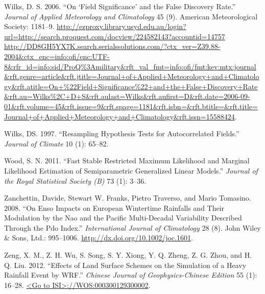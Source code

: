 \documentclass[fleqn,10pt,lineno]{wlpeerj} %
\begin{document}
\hypertarget{ref-Wilks2006}{}
Wilks, D. S. 2006. ``On `Field Significance' and the False Discovery
Rate.'' \emph{Journal of Applied Meteorology and Climatology} 45 (9).
American Meteorological Society: 1181--9.
\href{http://ezproxy.library.usyd.edu.au/login?url=http://search.proquest.com/docview/224582143?accountid=14757\%20http://DD8GH5YX7K.search.serialssolutions.com/?ctx_ver=Z39.88-2004\&ctx_enc=info:ofi/enc:UTF-8\&rfr_id=info:sid/ProQ\%3Amilitary\&rft_val_fmt=info:ofi/fmt:kev:mtx:journal\&rft.genre=article\&rft.jtitle=Journal+of+Applied+Meteorology+and+Climatology\&rft.atitle=On+\%22Field+Significance\%22+and+the+False+Discovery+Rate\&rft.au=Wilks\%2C+D+S\&rft.aulast=Wilks\&rft.aufirst=D\&rft.date=2006-09-01\&rft.volume=45\&rft.issue=9\&rft.spage=1181\&rft.isbn=\&rft.btitle=\&rft.title=Journal+of+Applied+Meteorology+and+Climatology\&rft.issn=15588424}{http://ezproxy.library.usyd.edu.au/login?url=http://search.proquest.com/docview/224582143?accountid=14757 http://DD8GH5YX7K.search.serialssolutions.com/?ctx\_ver=Z39.88-2004\&ctx\_enc=info:ofi/enc:UTF-8\&rfr\_id=info:sid/ProQ\%3Amilitary\&rft\_val\_fmt=info:ofi/fmt:kev:mtx:journal\&rft.genre=article\&rft.jtitle=Journal+of+Applied+Meteorology+and+Climatology\&rft.atitle=On+\%22Field+Significance\%22+and+the+False+Discovery+Rate\&rft.au=Wilks\%2C+D+S\&rft.aulast=Wilks\&rft.aufirst=D\&rft.date=2006-09-01\&rft.volume=45\&rft.issue=9\&rft.spage=1181\&rft.isbn=\&rft.btitle=\&rft.title=Journal+of+Applied+Meteorology+and+Climatology\&rft.issn=15588424}.

\hypertarget{ref-Wilks1997}{}
Wilks, DS. 1997. ``Resampling Hypothesis Tests for Autocorrelated
Fields.'' \emph{Journal of Climate} 10 (1): 65--82.

\hypertarget{ref-Wood2011}{}
Wood, S. N. 2011. ``Fast Stable Restricted Maximum Likelihood and
Marginal Likelihood Estimation of Semiparametric Generalized Linear
Models.'' \emph{Journal of the Royal Statistical Society (B)} 73 (1):
3--36.

\hypertarget{ref-Zanchettin2008}{}
Zanchettin, Davide, Stewart W. Franks, Pietro Traverso, and Mario
Tomasino. 2008. ``On Enso Impacts on European Wintertime Rainfalls and
Their Modulation by the Nao and the Pacific Multi-Decadal Variability
Described Through the Pdo Index.'' \emph{International Journal of
Climatology} 28 (8). John Wiley \& Sons, Ltd.: 995--1006.
\url{http://dx.doi.org/10.1002/joc.1601}.

\hypertarget{ref-Zeng2012}{}
Zeng, X. M., Z. H. Wu, S. Song, S. Y. Xiong, Y. Q. Zheng, Z. G. Zhou,
and H. Q. Liu. 2012. ``Effects of Land Surface Schemes on the Simulation
of a Heavy Rainfall Event by WRF.'' \emph{Chinese Journal of
Geophysics-Chinese Edition} 55 (1): 16--28.
\href{\%3CGo\%20to\%20ISI\%3E://WOS:000300129300002}{\textless{}Go to ISI\textgreater{}://WOS:000300129300002}.
\end{document}
